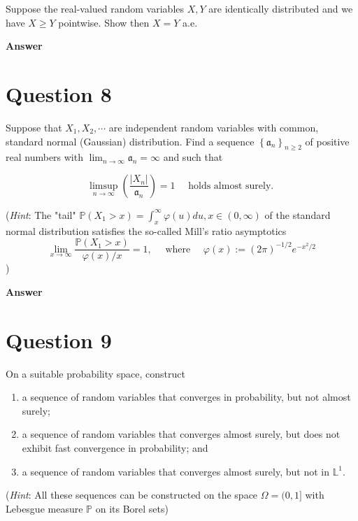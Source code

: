 \documentclass[letterpaper]{article}
\begin{document}
		Suppose the real-valued random variables $X, Y$ are identically distributed and we have $X \geq Y$ pointwise. Show then $X=Y$ a.e.
		
		
		\textbf{Answer}
		
		\clearpage
		
		\section{Question 8}
		
		Suppose that $X_{1}, X_{2}, \cdots$ are independent random variables with common, standard normal (Gaussian) distribution. Find a sequence $\left\{\mathfrak{a}_{n}\right\}_{n \geq 2}$ of positive real numbers with $\lim _{n \rightarrow \infty} \mathfrak{a}_{n}=\infty$ and such that
		
		$$
		\limsup _{n \rightarrow \infty}\left(\frac{\left|X_{n}\right|}{\mathfrak{a}_{n}}\right)=1 \quad \text { holds almost surely. }
		$$
		
		(\emph{Hint}: The "tail" $\mathbb{P}\left(X_{1}>x\right)=\int_{x}^{\infty} \varphi(u) d u, x \in(0, \infty)$ of the standard normal distribution satisfies the so-called Mill's ratio asymptotics
		$$
		\lim _{x \rightarrow \infty} \frac{\mathbb{P}\left(X_{1}>x\right)}{\varphi(x) / x}=1, \quad \text { where } \quad \varphi(x):=(2 \pi)^{-1 / 2} e^{-x^{2} / 2}
		$$)
		
		
		\textbf{Answer}
		
		\clearpage
		
		\section{Question 9}
		
		On a suitable probability space, construct
		\begin{enumerate}
			\item[(i)] a sequence of random variables that converges in probability, but not almost surely;
			
			\item[(ii)] a sequence of random variables that converges almost surely, but does not exhibit fast convergence in probability; and
			
			\item[(iii)] a sequence of random variables that converges almost surely, but not in $\mathbb{L}^{1}$.
		\end{enumerate}
		
		(\emph{Hint}: All these sequences can be constructed on the space $\Omega=(0,1]$ with Lebesgue measure $\mathbb{P}$ on its Borel sets)
		
\end{document}
